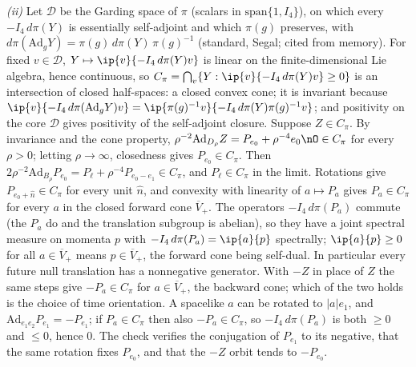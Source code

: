 \emph{(ii)} Let $\mathcal{D}$ be the Garding space of $\pi$ (scalars in $\mathrm{span}\{1, I_{4}\}$), on which every $-I_{4}\,d\pi(Y)$ is essentially self-adjoint and which $\pi(g)$ preserves, with $d\pi(\mathrm{Ad}_{g}Y) = \pi(g)\,d\pi(Y)\,\pi(g)^{-1}$ (standard, Segal; cited from memory). For fixed $v \in \mathcal{D}$, $Y \mapsto \ip{v}{-I_{4}\,d\pi(Y)v}$ is linear on the finite-dimensional Lie algebra, hence continuous, so $C_{\pi} = \bigcap_{v}\{Y : \ip{v}{-I_{4}\,d\pi(Y)v} \ge 0\}$ is an intersection of closed half-spaces: a closed convex cone; it is invariant because $\ip{v}{-I_{4}\,d\pi(\mathrm{Ad}_{g}Y)v} = \ip{\pi(g)^{-1}v}{-I_{4}\,d\pi(Y)\pi(g)^{-1}v}$; and positivity on the core $\mathcal{D}$ gives positivity of the self-adjoint closure. Suppose $Z \in C_{\pi}$. By invariance and the cone property, $\rho^{-2}\mathrm{Ad}_{D_{\rho}}Z = P_{e_{0}} + \rho^{-4}e_{0}\nO \in C_{\pi}$ for every $\rho > 0$; letting $\rho \to \infty$, closedness gives $P_{e_{0}} \in C_{\pi}$. Then $2\rho^{-2}\mathrm{Ad}_{B_{\rho}}P_{e_{0}} = P_{\ell} + \rho^{-4}P_{e_{0} - e_{1}} \in C_{\pi}$, and $P_{\ell} \in C_{\pi}$ in the limit. Rotations give $P_{e_{0} + \hat n} \in C_{\pi}$ for every unit $\hat n$, and convexity with linearity of $a \mapsto P_{a}$ gives $P_{a} \in C_{\pi}$ for every $a$ in the closed forward cone $\overline{V}_{+}$. The operators $-I_{4}\,d\pi(P_{a})$ commute (the $P_{a}$ do and the translation subgroup is abelian), so they have a joint spectral measure on momenta $p$ with $-I_{4}\,d\pi(P_{a}) = \ip{a}{p}$ spectrally; $\ip{a}{p} \ge 0$ for all $a \in \overline{V}_{+}$ means $p \in \overline{V}_{+}$, the forward cone being self-dual. In particular every future null translation has a nonnegative generator. With $-Z$ in place of $Z$ the same steps give $-P_{a} \in C_{\pi}$ for $a \in \overline{V}_{+}$, the backward cone; which of the two holds is the choice of time orientation. A spacelike $a$ can be rotated to $|a|e_{1}$, and $\mathrm{Ad}_{e_{1}e_{2}}P_{e_{1}} = -P_{e_{1}}$; if $P_{a} \in C_{\pi}$ then also $-P_{a} \in C_{\pi}$, so $-I_{4}\,d\pi(P_{a})$ is both $\ge 0$ and $\le 0$, hence $0$. The check verifies the conjugation of $P_{e_{1}}$ to its negative, that the same rotation fixes $P_{e_{0}}$, and that the $-Z$ orbit tends to $-P_{e_{0}}$.

